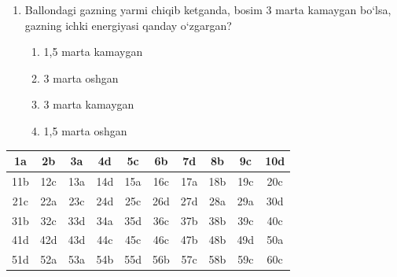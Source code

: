 \begin{enumerate}
\begin{enumerate}[label=\Alph*)]
\end{enumerate}

\item Ballondagi gazning yarmi chiqib ketganda, bosim 3 marta kamaygan bo‘lsa, gazning ichki energiyasi qanday o‘zgargan?
\begin{enumerate}[label=\Alph*)]
\item 1,5 marta kamaygan
\item 3 marta oshgan
\item 3 marta kamaygan
\item 1,5 marta oshgan

\end{enumerate}

\end{enumerate}



\begin{table}[!ht]
\centering
\begin{tabular}{|c|c|c|c|c|c|c|c|c|c|}
\hline
1a & 2b & 3a & 4d & 5c & 6b & 7d & 8b & 9c & 10d \\ \hline
11b & 12c & 13a & 14d & 15a & 16c & 17a & 18b & 19c & 20c \\ \hline
21c & 22a & 23c & 24d & 25c & 26d & 27d & 28a & 29a & 30d \\ \hline
31b & 32c & 33d & 34a & 35d & 36c & 37b & 38b & 39c & 40c \\ \hline
41d & 42d & 43d & 44c & 45c & 46c & 47b & 48b & 49d & 50a \\ \hline
51d & 52a & 53a & 54b & 55d & 56b & 57c & 58b & 59c & 60c \\ \hline
\end{tabular}
\end{table}